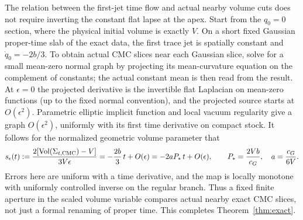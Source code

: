 The relation between the first-jet time flow and actual nearby volume cuts does not require inverting the constant flat lapse at the apex. Start from the \(q_0=0\) section, where the physical initial volume is exactly \(V\). On a short fixed Gaussian proper-time slab of the exact data, the first trace jet is spatially constant and \(\dot q_0=-2b/3\). To obtain actual CMC slices near each Gaussian slice, solve for a small mean-zero normal graph by projecting its mean-curvature equation on the complement of constants; the actual constant mean is then read from the result. At \(\epsilon=0\) the projected derivative is the invertible flat Laplacian on mean-zero functions (up to the fixed normal convention), and the projected source starts at \(O(\epsilon^2)\). Parametric elliptic implicit function and local vacuum regularity give a graph \(O(\epsilon^2)\), uniformly with its first time derivative on compact stock. It follows for the normalized geometric volume parameter that
\begin{equation}\label{eq:geomvol}
     s_\epsilon(t):=\frac{2[\operatorname{Vol}(\Sigma_{t,\mathrm{CMC}})-V]}{3V\epsilon}
           =-\frac{2b}{3}\,t+O(\epsilon)
           =-2a P_*\,t+O(\epsilon),\qquad
        P_*=\frac{2Vb}{c_G},\quad a=\frac{c_G}{6V}.
\end{equation}
Errors here are uniform with a time derivative, and the map is locally monotone with uniformly controlled inverse on the regular branch. Thus a fixed finite aperture in the scaled volume variable compares actual nearby exact CMC slices, not just a formal renaming of proper time. This completes Theorem~\ref{thm:exact}.

